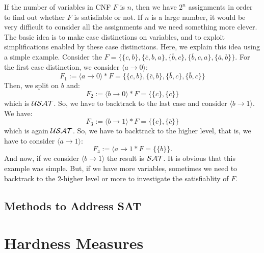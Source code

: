 \documentclass[12pt]{book}
\begin{document}
\begin{examp}\label{exp:bdd}
      If the number of variables in CNF $F$ is $n$, then we have $2^n$ assignments in order to find out whether $F$ is satisfiable or not.
      If $n$ is a large number, it would be very difficult to consider all the assignments and we need something more clever.
      The basic idea is to make case distinctions on variables, and to exploit simplifications enabled by these case distinctions.
      Here, we explain this idea using a simple example. Consider the $F = \{ \{c,b\}, \{\overline{c},b,a\}, \{\overline{b},c\}, \{\overline{b},c,a\}, \{{\overline{a},b}\} \}$. 
      For the first case distinction, we consider $\langle a \to 0 \rangle$:
      $$ F_1 := \langle a \to 0 \rangle * F = \{ \{c,b\}, \{\overline{c},b\}, \{\overline{b},c\}, \{\overline{b},c\} \}$$
      Then, we split on $b$ and:
      $$ F_2 := \langle b \to 0 \rangle * F = \{ \{c\}, \{\overline{c}\} \}$$
      which is $\mathcal{USAT}$. So, we have to backtrack to the last case and consider $\langle b \to 1 \rangle$. We have:
      $$ F_3 := \langle b \to 1 \rangle * F = \{ \{c\}, \{\overline{c}\} \}$$
      which is again $\mathcal{USAT}$. So, we have to backtrack to the higher level, that is, we have to consider $\langle a \to 1 \rangle$:
      $$ F_4 := \langle a \to 1 * F = \{ \{b\} \}.$$
      And  now, if we consider $\langle b \to 1 \rangle$ the result is $\mathcal{SAT}$. It is obvious that this example was simple. But, if we have more variables, 
      sometimes we need to backtrack to the 2-higher level or more to investigate the satisfiablity of $F$.
\end{examp}
\section{Methods to Address SAT}
\label{sec:Methods to Address SAT}

\chapter{Hardness Measures}
\label{cha:Hardness Measures}
\end{document}
